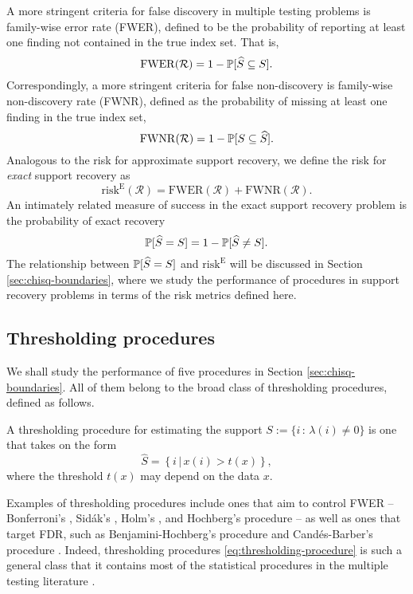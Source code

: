 A more stringent criteria for false discovery in multiple testing problems is family-wise error rate (FWER), defined to be the probability of reporting at least one finding not contained in the true index set.
That is,
\begin{equation} \label{eq:FWER}
    \mathrm{FWER}(\mathcal{R}) = 1 - \P[\widehat{S} \subseteq S].
\end{equation}
Correspondingly, a more stringent criteria for false non-discovery is family-wise non-discovery rate (FWNR), defined as the probability of missing at least one finding in the true index set,
\begin{equation} \label{eq:FWNDR}
    \mathrm{FWNR}(\mathcal{R}) = 1 - \P[S \subseteq \widehat{S}].
\end{equation}
Analogous to the risk for approximate support recovery, we define the risk for \emph{exact} support recovery as
\begin{equation} \label{eq:risk-exact}
    \mathrm{risk}^{\mathrm{E}}(\mathcal{R}) = \mathrm{FWER}(\mathcal{R}) + \mathrm{FWNR}(\mathcal{R}).
\end{equation}
An intimately related measure of success in the exact support recovery problem is the probability of exact recovery 
\begin{equation} \label{eq:risk-prob}
    \P[\widehat{S} = S] = 1 - \P[\widehat{S} \neq S].
\end{equation}
The relationship between $\P[\widehat{S} = S]$ and $\mathrm{risk}^{\mathrm{E}}$ will be discussed in Section \ref{sec:chisq-boundaries}, where we study the performance of procedures in support recovery problems in terms of the risk metrics defined here.

\subsection{Thresholding procedures}
\label{subsec:thresholding-procedures}

We shall study the performance of five procedures in Section \ref{sec:chisq-boundaries}.
All of them belong to the broad class of thresholding procedures, defined as follows.
\begin{definition}
A thresholding procedure for estimating the support 
$S:=\{i\, :\, \lambda(i)\neq0\}$ is one that takes on the form
\begin{equation} \label{eq:thresholding-procedure}
    \widehat{S} = \left\{i\,|\,x(i) > t(x)\right\},
\end{equation}
where the threshold $t(x)$ may depend on the data $x$.
\end{definition}
Examples of thresholding procedures include ones that aim to control FWER -- Bonferroni's \cite{dunn1961multiple}, Sid\'ak's \citep{vsidak1967rectangular}, Holm's \citep{holm1979simple}, and Hochberg's procedure \citep{hochberg1988sharper} -- as well as ones that target FDR, such as Benjamini-Hochberg's procedure \cite{benjamini1995controlling} and Cand\'es-Barber's procedure \cite{barber2015controlling}.
Indeed, thresholding procedures \eqref{eq:thresholding-procedure} is such a general class that it contains most of the statistical procedures in the multiple testing literature \cite{roquain2011type}.


